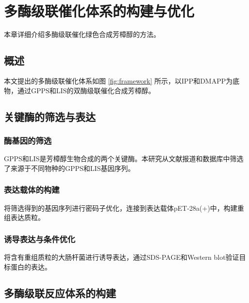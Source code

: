 \section{多酶级联催化体系的构建与优化}


本章详细介绍多酶级联催化绿色合成芳樟醇的方法。

\subsection{概述}


本文提出的多酶级联催化体系如图 \ref{fig:framework} 所示，以IPP和DMAPP为底物，通过GPPS和LIS的双酶级联催化合成芳樟醇。

\subsection{关键酶的筛选与表达}

\subsubsection{酶基因的筛选}


GPPS和LIS是芳樟醇生物合成的两个关键酶。本研究从文献报道和数据库中筛选了来源于不同物种的GPPS和LIS基因序列。

\subsubsection{表达载体的构建}


将筛选得到的基因序列进行密码子优化，连接到表达载体pET-28a(+)中，构建重组表达质粒。

\subsubsection{诱导表达与条件优化}


将含有重组质粒的大肠杆菌进行诱导表达，通过SDS-PAGE和Western blot验证目标蛋白的表达。

\subsection{多酶级联反应体系的构建}

